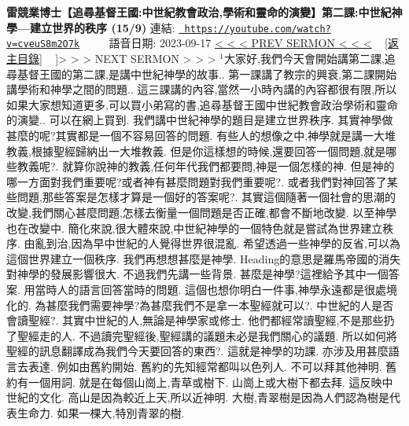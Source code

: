 \documentclass{book}
\begin{document}
\section{}
\label{sec:cveuS8m2O7k}
\textbf{雷競業博士【追尋基督王國:中世紀教會政治,學術和靈命的演變】第二課:中世紀神學—建立世界的秩序 (15/9)}
\newline
\newline
連結: \href{https://youtube.com/watch?v=cveuS8m2O7k}{\texttt{ https://youtube.com/watch?v=cveuS8m2O7k}} ~~~~ 語音日期: 2023-09-17 
\newline
\newline
\hyperref[sec:sTByjA4YMcM]{\small{< < < PREV SERMON < < <}}
~
\hyperref[sec:index]{\small{[返主目錄]}}
~
\hyperref[sec:nPtT6PycYE]]{\small{> > > NEXT SERMON > > >}}
\newline
\newline
$^{1}$大家好,我們今天會開始講第二課,追尋基督王國的第二課,是講中世紀神學的故事..
第一課講了教宗的興衰,第二課開始講學術和神學之間的問題..
這三課講的內容,當然一小時內講的內容都很有限,所以如果大家想知道更多,可以買小弟寫的書,追尋基督王國中世紀教會政治學術和靈命的演變..
可以在網上買到.
我們講中世紀神學的題目是建立世界秩序.
其實神學做甚麼的呢?其實都是一個不容易回答的問題.
有些人的想像之中,神學就是講一大堆教義,根據聖經歸納出一大堆教義.
但是你這樣想的時候,還要回答一個問題,就是哪些教義呢?.
就算你說神的教義,任何年代我們都要問,神是一個怎樣的神.
但是神的哪一方面對我們重要呢?或者神有甚麼問題對我們重要呢?.
或者我們對神回答了某些問題,那些答案是怎樣才算是一個好的答案呢?.
其實這個隨著一個社會的思潮的改變,我們關心甚麼問題,怎樣去衡量一個問題是否正確,都會不斷地改變.
以至神學也在改變中.
簡化來說,很大體來說,中世紀神學的一個特色就是嘗試為世界建立秩序.
由亂到治,因為早中世紀的人覺得世界很混亂.
希望透過一些神學的反省,可以為這個世界建立一個秩序.
我們再想想甚麼是神學.
Heading的意思是羅馬帝國的消失對神學的發展影響很大.
不過我們先講一些背景.
甚麼是神學?這裡給予其中一個答案.
用當時人的語言回答當時的問題.
這個也想你明白一件事,神學永遠都是很處境化的.
為甚麼我們需要神學?為甚麼我們不是拿一本聖經就可以?.
中世紀的人是否會讀聖經?.
其實中世紀的人,無論是神學家或修士.
他們都經常讀聖經,不是那些扔了聖經走的人.
不過讀完聖經後,聖經講的議題未必是我們關心的議題.
所以如何將聖經的訊息翻譯成為我們今天要回答的東西?.
這就是神學的功課.
亦涉及用甚麼語言去表達.
例如由舊約開始.
舊約的先知經常都叫以色列人.
不可以拜其他神明.
舊約有一個用詞.
就是在每個山崗上,青草或樹下.
山崗上或大樹下都去拜.
這反映中世紀的文化.
高山是因為較近上天,所以近神明.
大樹,青翠樹是因為人們認為樹是代表生命力.
如果一棵大,特別青翠的樹.
\end{document}
